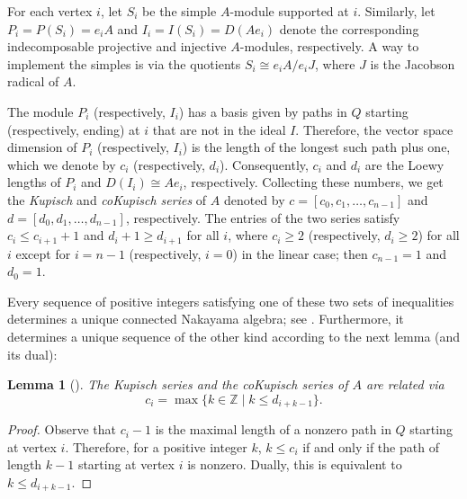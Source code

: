 \documentclass[a4paper]{amsart}
\newtheorem{lemma}[theorem]{Lemma}
\theoremstyle{definition}
\theoremstyle{remark}
\numberwithin{equation}{theorem}
\newcommand{\Dfn}[1]{\emph{\color{blue}#1}} %
\newcommand{\Z}{\mathbb{Z}}
\newcommand{\kupisch}{\left[c_0, c_1,\dots, c_{n-1}\right]}
\newcommand{\cokupisch}{\left[d_0, d_1,\dots, d_{n-1}\right]}
\begin{document}
For each vertex $i$, let $ S_i $ be the simple $ A $-module supported at $ i $. Similarly, let $P_i = P(S_i) = e_i A$ and $I_i = I(S_i) = D(A e_i)$ denote the corresponding indecomposable projective and injective $A$-modules, respectively. A way to implement the simples is via the quotients $ S_i \cong e_i A / e_i J $, where $ J $ is the Jacobson radical of $ A $.

The module $P_i$ (respectively, $I_i$)  has a basis given by paths in $Q$ starting (respectively, ending) at $i$ that are not in the ideal $I$. Therefore, the vector space dimension of $P_i$ (respectively, $I_i$) is the length of the longest such path plus one, which we denote by $c_i$ (respectively, $d_i$). Consequently, $ c_i $ and $ d_i $ are the Loewy lengths of $ P_i $ and $ D(I_i) \cong A e_i $, respectively.
Collecting these numbers, we get the \Dfn{Kupisch} and \Dfn{coKupisch series} of $A$ denoted by $ c=\kupisch$ and $d=\cokupisch$, respectively. The entries of the two series satisfy $ c_{i} \leq c_{i + 1} + 1 $ and $d_{i} + 1 \geq d_{i + 1}$ for all $ i $, where $ c_i \geq 2 $ (respectively, $ d_i \geq 2 $) for all $ i $ except for $ i=n-1 $ (respectively, $ i= 0 $) in the linear case; then $ c_{n-1} = 1 $ and $ d_0 = 1 $.

Every sequence of positive integers satisfying one of these two sets of inequalities determines a unique connected Nakayama algebra; see \cite[Theorem 32.9]{AF}.
Furthermore, it determines a unique sequence of the other kind according to the next lemma (and its dual):
\begin{lemma}[\mbox{\cite[Theorem 2.2]{F}}]\label{lem:kupisch-cokupisch}
    The Kupisch series and the coKupisch series of $A$ are related via
    \[
    c_i = \max \bigl\{ k \in \Z \mid k\leq d_{i+k-1} \bigr\}.
    \]
\end{lemma}
\begin{proof}
    Observe that $c_i-1$ is the maximal length of a nonzero path in $Q$ starting at vertex $ i $. Therefore, for a positive integer $ k $, $ k \leq c_i $ if and only if the path of length $ k-1 $ starting at vertex $ i $ is nonzero. Dually, this is equivalent to $ k \leq d_{ i+k-1 } $.
\end{proof}
\end{document}
